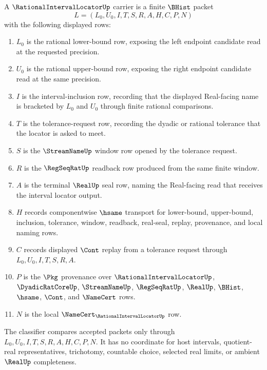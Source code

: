 \begin{definition}
\label{def:rational-interval-locator-carrier}
A $\RationalIntervalLocatorUp$ carrier is a finite $\BHist$ packet
$$
L=(L_0,U_0,I,T,S,R,A,H,C,P,N)
$$
with the following displayed rows:
\begin{enumerate}
\item $L_0$ is the rational lower-bound row, exposing the left endpoint candidate read at the requested precision.
\item $U_0$ is the rational upper-bound row, exposing the right endpoint candidate read at the same precision.
\item $I$ is the interval-inclusion row, recording that the displayed Real-facing name is bracketed by $L_0$ and $U_0$ through finite rational comparisons.
\item $T$ is the tolerance-request row, recording the dyadic or rational tolerance that the locator is asked to meet.
\item $S$ is the $\StreamNameUp$ window row opened by the tolerance request.
\item $R$ is the $\RegSeqRatUp$ readback row produced from the same finite window.
\item $A$ is the terminal $\RealUp$ seal row, naming the Real-facing read that receives the interval locator output.
\item $H$ records componentwise $\hsame$ transport for lower-bound, upper-bound, inclusion, tolerance, window, readback, real-seal, replay, provenance, and local naming rows.
\item $C$ records displayed $\Cont$ replay from a tolerance request through $L_0,U_0,I,T,S,R,A$.
\item $P$ is the $\Pkg$ provenance over $\RationalIntervalLocatorUp$, $\DyadicRatCoreUp$, $\StreamNameUp$, $\RegSeqRatUp$, $\RealUp$, $\BHist$, $\hsame$, $\Cont$, and $\NameCert$ rows.
\item $N$ is the local $\NameCert_{\RationalIntervalLocatorUp}$ row.
\end{enumerate}
The classifier compares accepted packets only through $L_0,U_0,I,T,S,R,A,H,C,P,N$. It has no coordinate for host intervals, quotient-real representatives, trichotomy, countable choice, selected real limits, or ambient $\RealUp$ completeness.
\end{definition}

